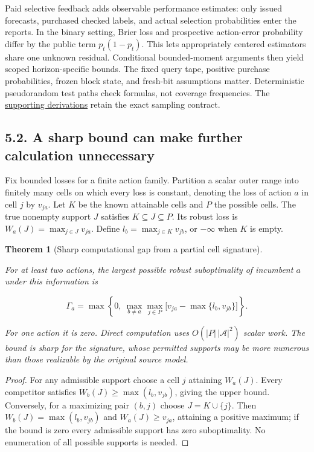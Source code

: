 \documentclass{article}
\newtheorem{theorem}{Theorem}
\theoremstyle{definition}
\begin{document}
Paid selective feedback adds observable performance estimates: only
issued forecasts, purchased checked labels, and actual selection
probabilities enter the reports. In the binary setting, Brier loss and
prospective action-error probability differ by the public term
\(p_t(1-p_t)\). This lets appropriately centered estimators share one
unknown residual. Conditional bounded-moment arguments then yield scoped
horizon-specific bounds. The fixed query tape, positive purchase
probabilities, frozen block state, and fresh-bit assumptions matter.
Deterministic pseudorandom test paths check formulas, not coverage
frequencies. The
\href{https://github.com/TristanMiano/value_logic/blob/main/v3/derivations/07_observable_performance.md}{supporting
derivations} retain the exact sampling contract.

\subsection{5.2. A sharp bound can make further calculation
unnecessary}\label{sec-stopping}

Fix bounded losses for a finite action family. Partition a scalar outer
range into finitely many cells on which every loss is constant, denoting
the loss of action \(a\) in cell \(j\) by \(v_{ja}\). Let \(K\) be the
known attainable cells and \(P\) the possible cells. The true nonempty
support \(J\) satisfies \(K\subseteq J\subseteq P\). Its robust loss is
\(W_a(J)=\max_{j\in J}v_{ja}\). Define \(l_b=\max_{j\in K}v_{jb}\), or
\(-\infty\) when \(K\) is empty.

\begin{theorem}[Sharp computational gap from a partial cell signature]\label{thm-gap}

For at least two actions, the largest possible robust suboptimality of
incumbent \(a\) under this information is

\begin{equation}
\Gamma_a=\max\left\{0,\ \max_{b\ne a}\max_{j\in P}
          \bigl[v_{ja}-\max\{l_b,v_{jb}\}\bigr]\right\}.
 \label{eq-gap}
\end{equation}

For one action it is zero. Direct computation uses
\(O(|P|\,|\mathcal A|^2)\) scalar work. The bound is sharp for the
signature, whose permitted supports may be more numerous than those
realizable by the original source model.

\end{theorem}

\begin{proof}

For any admissible support choose a cell \(j\) attaining \(W_a(J)\).
Every competitor satisfies \(W_b(J)\geq\max(l_b,v_{jb})\), giving the
upper bound. Conversely, for a maximizing pair \((b,j)\) choose
\(J=K\cup\{j\}\). Then \(W_b(J)=\max(l_b,v_{jb})\) and
\(W_a(J)\geq v_{ja}\), attaining a positive maximum; if the bound is
zero every admissible support has zero suboptimality. No enumeration of
all possible supports is needed.
\end{proof}
\end{document}

